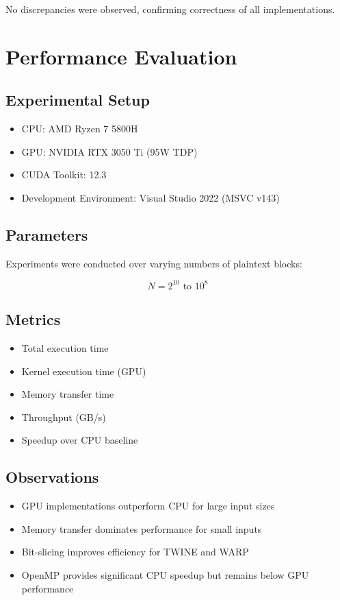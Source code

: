 No discrepancies were observed, confirming correctness of all implementations.

\section{Performance Evaluation}

\subsection{Experimental Setup}

\begin{itemize}
    \item CPU: AMD Ryzen 7 5800H
    \item GPU: NVIDIA RTX 3050 Ti (95W TDP)
    \item CUDA Toolkit: 12.3
    \item Development Environment: Visual Studio 2022 (MSVC v143)
\end{itemize}

\subsection{Parameters}

Experiments were conducted over varying numbers of plaintext blocks:

\begin{equation}
N = 2^{10} \text{ to } 10^8
\end{equation}

\subsection{Metrics}

\begin{itemize}
    \item Total execution time
    \item Kernel execution time (GPU)
    \item Memory transfer time
    \item Throughput (GB/s)
    \item Speedup over CPU baseline
\end{itemize}

\subsection{Observations}

\begin{itemize}
    \item GPU implementations outperform CPU for large input sizes
    \item Memory transfer dominates performance for small inputs
    \item Bit-slicing improves efficiency for TWINE and WARP
    \item OpenMP provides significant CPU speedup but remains below GPU performance
\end{itemize}

